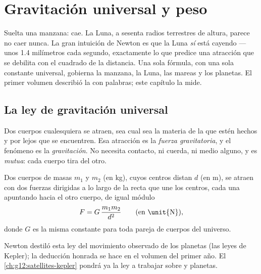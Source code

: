 \chapter{Gravitación universal y peso}\label{ch:g10:universal-gravitation}

Suelta una manzana: cae. La Luna, a sesenta radios terrestres de altura,
parece no caer nunca. La gran intuición de Newton es que la Luna
\emph{sí} está cayendo --- unos 1.4 milímetros cada segundo, exactamente
lo que predice una atracción que se debilita con el cuadrado de la
distancia. Una sola fórmula, con una sola constante universal, gobierna
la manzana, la Luna, las mareas y los planetas. El primer volumen
describió la  con palabras; este capítulo la mide.

\section{La ley de gravitación universal}

\begin{definition}\label{def:g10:universal-gravitation:force}
Dos cuerpos cualesquiera se atraen, sea cual sea la materia de la que
estén hechos y por lejos que se encuentren. Esa atracción es la
\emph{fuerza gravitatoria}, y el fenómeno es
la \emph{gravitación}. No necesita contacto, ni
cuerda, ni medio alguno, y es \emph{mutua}: cada cuerpo tira del otro.
\end{definition}

\begin{theorem}\label{thm:g10:universal-gravitation:law}
Dos cuerpos de masas $m_1$ y $m_2$ (en \unit{kg}), cuyos centros distan
$d$ (en \unit{m}), se atraen con dos fuerzas dirigidas a lo largo de la
recta que une los centros, cada una apuntando hacia el otro cuerpo, de
igual módulo
\[
F = G\,\frac{m_1 m_2}{d^2}
\qquad \text{(en \unit{N})},
\]
donde $G$ es la misma constante para toda pareja de cuerpos del
universo.
\end{theorem}
\admitted

\begin{remark}
Newton destiló esta ley del movimiento observado de los planetas (las
leyes de Kepler); la deducción honrada se hace en el volumen del primer
año. El \cref{ch:g12:satellites-kepler} pondrá ya la ley a trabajar
sobre  y planetas.
\end{remark}

